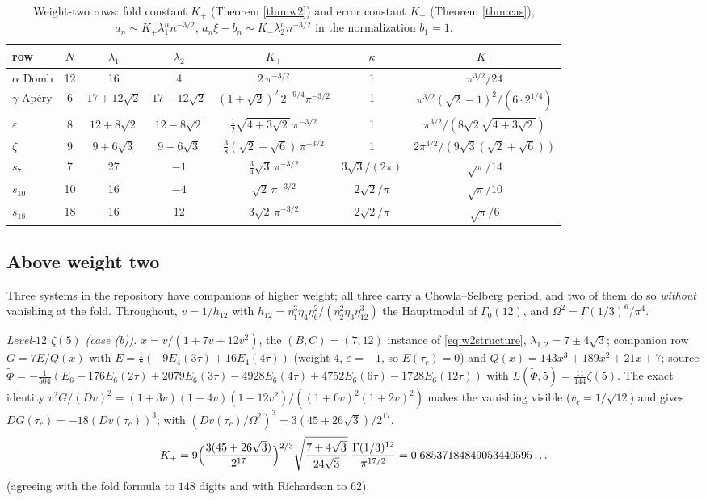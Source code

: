 \documentclass[11pt]{amsart}
\theoremstyle{definition}
\theoremstyle{remark}
\begin{document}
\begin{table}[ht]
\caption{Weight-two rows: fold constant $K_+$ (Theorem \ref{thm:w2}) and error constant $K_-$ (Theorem \ref{thm:cas}), $a_n\sim K_+\lambda_1^nn^{-3/2}$, $a_n\xi-b_n\sim K_-\lambda_2^nn^{-3/2}$ in the normalization $b_1=1$.}\label{tab:w2}
\small\renewcommand{\arraystretch}{1.3}
\begin{tabular}{@{}lcccccc@{}}\toprule
row & $N$ & $\lambda_1$ & $\lambda_2$ & $K_+$ & $\kappa$ & $K_-$\\\midrule
$\alpha$ Domb & 12 & 16 & 4 & $2\,\pi^{-3/2}$ & 1 & $\pi^{3/2}/24$\\
$\gamma$ Ap\'ery & 6 & $17+12\sqrt2$ & $17-12\sqrt2$ & $(1+\sqrt2)^2\,2^{-9/4}\pi^{-3/2}$ & 1 & $\pi^{3/2}(\sqrt2-1)^2/(6\cdot2^{1/4})$\\
$\varepsilon$ & 8 & $12+8\sqrt2$ & $12-8\sqrt2$ & $\tfrac12\sqrt{4+3\sqrt2}\,\pi^{-3/2}$ & 1 & $\pi^{3/2}/(8\sqrt2\sqrt{4+3\sqrt2})$\\
$\zeta$ & 9 & $9+6\sqrt3$ & $9-6\sqrt3$ & $\tfrac38(\sqrt2+\sqrt6)\,\pi^{-3/2}$ & 1 & $2\pi^{3/2}/(9\sqrt3(\sqrt2+\sqrt6))$\\
$s_7$ & 7 & 27 & $-1$ & $\tfrac34\sqrt3\,\pi^{-3/2}$ & $3\sqrt3/(2\pi)$ & $\sqrt\pi/14$\\
$s_{10}$ & 10 & 16 & $-4$ & $\sqrt2\,\pi^{-3/2}$ & $2\sqrt2/\pi$ & $\sqrt\pi/10$\\
$s_{18}$ & 18 & 16 & 12 & $3\sqrt2\,\pi^{-3/2}$ & $2\sqrt2/\pi$ & $\sqrt\pi/6$\\\bottomrule
\end{tabular}
\end{table}

\subsection{Above weight two}\label{sec:higher}
Three systems in the repository have companions of higher weight; all three carry a Chowla--Selberg period, and two of them do so \emph{without} vanishing at the fold. Throughout, $v=1/h_{12}$ with $h_{12}=\eta_1^3\eta_4\eta_6^2/(\eta_2^2\eta_3\eta_{12}^3)$ the Hauptmodul of $\Gamma_0(12)$, and $\Omega^2=\Gamma(1/3)^6/\pi^4$.

\emph{Level-$12$ $\zeta(5)$ (case (b)).} $x=v/(1+7v+12v^2)$, the $(B,C)=(7,12)$ instance of \eqref{eq:w2structure}, $\lambda_{1,2}=7\pm4\sqrt3$; companion row $G=7E/Q(x)$ with $E=\frac17(-9E_4(3\tau)+16E_4(4\tau))$ (weight $4$, $\varepsilon=-1$, so $E(\tau_c)=0$) and $Q(x)=143x^3+189x^2+21x+7$; source $\widetilde\Phi=-\frac1{504}(E_6-176E_6(2\tau)+2079E_6(3\tau)-4928E_6(4\tau)+4752E_6(6\tau)-1728E_6(12\tau))$ with $L(\widetilde\Phi,5)=\frac{11}{144}\zeta(5)$. The exact identity $v^2G/(Dv)^2=(1+3v)(1+4v)(1-12v^2)/((1+6v)^2(1+2v)^2)$ makes the vanishing visible ($v_c=1/\sqrt{12}$) and gives $DG(\tau_c)=-18(Dv(\tau_c))^3$; with $(Dv(\tau_c)/\Omega^2)^3=3(45+26\sqrt3)/2^{17}$,
$$K_+=9\Bigl(\frac{3(45+26\sqrt3)}{2^{17}}\Bigr)^{2/3}\sqrt{\frac{7+4\sqrt3}{24\sqrt3}}\;\frac{\Gamma(1/3)^{12}}{\pi^{17/2}}=0.68537184849053440595\ldots$$
(agreeing with the fold formula to $148$ digits and with Richardson to $62$).
\end{document}
